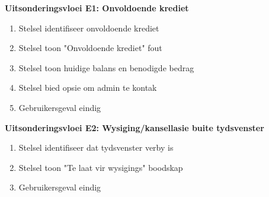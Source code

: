 \textbf{Uitsonderingsvloei E1: Onvoldoende krediet}
\begin{enumerate}
    \item[8a.] Stelsel identifiseer onvoldoende krediet
    \item Stelsel toon "Onvoldoende krediet" fout
    \item Stelsel toon huidige balans en benodigde bedrag
    \item Stelsel bied opsie om admin te kontak
    \item Gebruikersgeval eindig
\end{enumerate}

\textbf{Uitsonderingsvloei E2: Wysiging/kansellasie buite tydsvenster}
\begin{enumerate}
    \item[1d.] Stelsel identifiseer dat tydsvenster verby is
    \item Stelsel toon "Te laat vir wysigings" boodskap
    \item Gebruikersgeval eindig
\end{enumerate}

